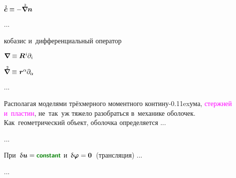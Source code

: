 \begin{otherlanguage}{russian}
${\mathtwoabove{\bm{c}} \equiv - \boldnablaflat \bm{n}}$

...

\noindent кобазис и~дифференциальный оператор 

${\bm{\nabla}\hspace{-0.2ex} \equiv \bm{R}^{\hspace{.1ex}i} \hspace{-0.1ex} \partial_i}$

${\boldnablaflat \equiv \hspace{.1ex} \bm{r}^\alpha \hspace{-0.1ex} \partial_{\hspace{-0.1ex}\alpha}}$

...




\end{otherlanguage}



\begin{otherlanguage}{russian}

Располагая моделями трёхмерного моментного контину\kern-0.11exума, \textcolor{magenta}{стержней и~пластин}, не~так~уж тяжело разобраться в~механике оболочек. Как~геометрический объект, оболочка определяется ...

...







\end{otherlanguage}



\begin{otherlanguage}{russian}

При~${\variation{\fieldofdisplacements} = \boldconstant}$ и~${\updelta\hspace{-0.1ex}\bm{\varphi} = \bm{0}}$~(трансляция) ...

...



\end{otherlanguage}

